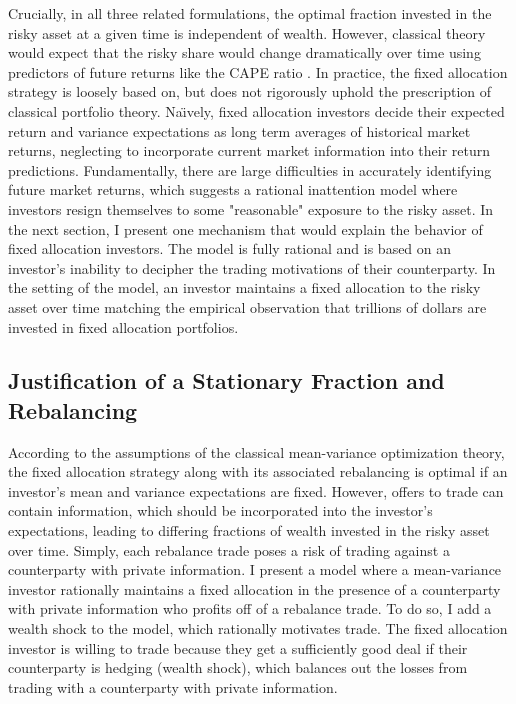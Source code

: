 \documentclass[12pt]{article}
\begin{document}
Crucially, in all three related formulations, the optimal fraction invested in the risky asset at a given time is independent of wealth. However, classical theory would expect that the risky share would change dramatically over time using predictors of future returns like the CAPE ratio \citep{campbell1998valuation}. In practice, the fixed allocation strategy is loosely based on, but does not rigorously uphold the prescription of classical portfolio theory. Na\"{\i}vely, fixed allocation investors decide their expected return and variance expectations as long term averages of historical market returns, neglecting to incorporate current market information into their return predictions. Fundamentally, there are large difficulties in accurately identifying future market returns, which suggests a rational inattention model where investors resign themselves to some "reasonable" exposure to the risky asset.
In the next section, I present one mechanism that would explain the behavior of fixed allocation investors. The model is fully rational and is based on an investor's inability to decipher the trading motivations of their counterparty. In the setting of the model, an investor maintains a fixed allocation to the risky asset over time matching the empirical observation that trillions of dollars are invested in fixed allocation portfolios.



\subsection{Justification of a Stationary Fraction and Rebalancing}

\par According to the assumptions of the classical mean-variance optimization theory, the fixed allocation strategy along with its associated rebalancing is optimal if an investor's mean and variance expectations are fixed. However, offers to trade can contain information, which should be incorporated into the investor's expectations, leading to differing fractions of wealth invested in the risky asset over time. Simply, each rebalance trade poses a risk of trading against a counterparty with private information. I present a model where a mean-variance investor rationally maintains a fixed allocation in the presence of a counterparty with private information who profits off of a rebalance trade. To do so, I add a wealth shock to the \citet{MILGROM198217} model, which rationally motivates trade. The fixed allocation investor is willing to trade because they get a sufficiently good deal if their counterparty is hedging (wealth shock), which balances out the losses from trading with a counterparty with private information. 
\end{document}

